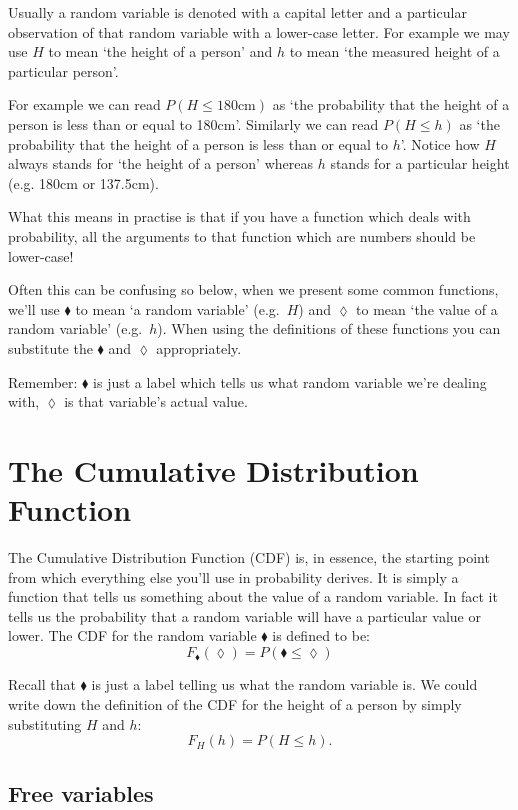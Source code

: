 \documentclass[a4paper]{article}
\begin{document}
Usually a random variable is denoted with a capital letter and a particular
observation of that random variable with a lower-case letter. For example we
may use $H$ to mean `the height of a person' and $h$ to mean `the measured
height of a particular person'.

For example we can read $P(H \le 180\mbox{cm})$ as `the probability that the
height of a person is less than or equal to 180cm'. Similarly we can read $P(H
\le h)$ as `the probability that the height of a person is less than or equal
to $h$'. Notice how $H$ always stands for `the height of a person' whereas $h$
stands for a particular height (e.g. 180cm or 137.5cm).

What this means in practise is that if you have a function which deals with
probability, all the arguments to that function which are numbers should be
lower-case!

Often this can be confusing so below, when we present some common functions,
we'll use $\blacklozenge$ to mean `a random variable' (e.g.\ $H$) and
$\lozenge$ to mean `the value of a random variable' (e.g.\ $h$). When using the
definitions of these functions you can substitute the $\blacklozenge$ and
$\lozenge$ appropriately.

Remember: $\blacklozenge$ is just a label which tells us what random variable
we're dealing with, $\lozenge$ is that variable's actual value.

\section{The Cumulative Distribution Function}

The Cumulative Distribution Function (CDF) is, in essence, the starting point
from which everything else you'll use in probability derives. It is simply a
function that tells us something about the value of a random variable. In fact
it tells us the probability that a random variable will have a particular value
or lower. The CDF for the random variable $\blacklozenge$ is defined to be: 
\[
\boxed{ F_\blacklozenge(\lozenge) = P(\blacklozenge \le \lozenge) }
\]

Recall that $\blacklozenge$ is just a label telling us what the random variable
is. We could write down the definition of the CDF for the height of a person by
simply substituting $H$ and $h$:
\[
F_H(h) = P(H \le h).
\]

\subsection{Free variables}
\end{document}
